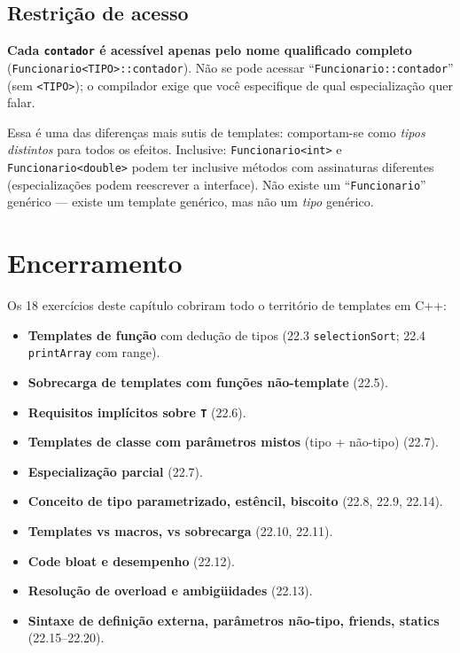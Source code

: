 \documentclass[11pt,a4paper]{article}
\begin{document}
\subsection*{Restri\c{c}\~ao de acesso}

\textbf{Cada \texttt{contador} \'e acess\'ivel apenas pelo nome qualificado completo} (\texttt{Funcionario<TIPO>::contador}). N\~ao se pode acessar ``\texttt{Funcionario::contador}'' (sem \texttt{<TIPO>}); o compilador exige que voc\^e especifique de qual especializa\c{c}\~ao quer falar.

\begin{obseng}
Essa \'e uma das diferen\c{c}as mais sutis de templates: comportam-se como \emph{tipos distintos} para todos os efeitos. Inclusive: \texttt{Funcionario<int>} e \texttt{Funcionario<double>} podem ter inclusive m\'etodos com assinaturas diferentes (especializa\c{c}\~oes podem reescrever a interface). N\~ao existe um ``\texttt{Funcionario}'' gen\'erico --- existe um template gen\'erico, mas n\~ao um \emph{tipo} gen\'erico.
\end{obseng}

\section*{Encerramento}

Os 18 exerc\'icios deste cap\'itulo cobriram todo o territ\'orio de templates em C++:

\begin{itemize}[leftmargin=*,itemsep=0pt]
  \item \textbf{Templates de fun\c{c}\~ao} com dedu\c{c}\~ao de tipos (22.3 \texttt{selectionSort}; 22.4 \texttt{printArray} com range).
  \item \textbf{Sobrecarga de templates com fun\c{c}\~oes n\~ao-template} (22.5).
  \item \textbf{Requisitos impl\'icitos sobre \texttt{T}} (22.6).
  \item \textbf{Templates de classe com par\^ametros mistos} (tipo + n\~ao-tipo) (22.7).
  \item \textbf{Especializa\c{c}\~ao parcial} (22.7).
  \item \textbf{Conceito de tipo parametrizado, est\^encil, biscoito} (22.8, 22.9, 22.14).
  \item \textbf{Templates vs macros, vs sobrecarga} (22.10, 22.11).
  \item \textbf{Code bloat e desempenho} (22.12).
  \item \textbf{Resolu\c{c}\~ao de overload e ambig\"{u}idades} (22.13).
  \item \textbf{Sintaxe de defini\c{c}\~ao externa, par\^ametros n\~ao-tipo, friends, statics} (22.15--22.20).
\end{itemize}
\end{document}
